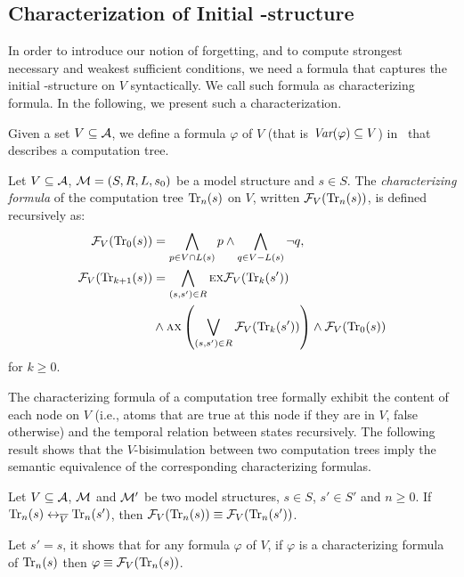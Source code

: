\documentclass[letterpaper]{article} %
\begin{document}
\subsection{Characterization of Initial \MPK-structure}

In order to introduce our notion of forgetting, and to compute strongest necessary and weakest sufficient conditions, we need a formula that captures the  initial \MPK-structure on $V$ syntactically. We call such formula as characterizing formula.
In the following, we present such a characterization.

Given a set $V\subseteq{\cal A}$, we define a formula $\varphi$ of $V$ (that is $\textit{Var}(\varphi) \subseteq V$) in \CTL\ that describes a computation tree.
\begin{definition}\label{def:V:char:formula}
Let $V\subseteq {\cal A}$, ${\cal M} =(S,R,L,s_0)$ be a model structure and $s\in S$.
The {\em characterizing formula} of the computation tree $\textrm{Tr}_n(s)$ on $V$,
written ${\cal F}_V(\textrm{Tr}_n(s))$, is defined recursively as:
\begin{align*}
   {\cal F}_V(\textrm{Tr}_0(s)) &=  \bigwedge_{p \in V\cap L(s)}p
     \wedge \bigwedge_{q\in V-L(s)} \neg q,\\
   {\cal F}_V(\textrm{Tr}_{k+1}(s))& = \bigwedge_{(s,s')\in R}
    \textsc{e} \textsc{x} {\cal F}_V(\textrm{Tr}_k(s'))\\
  &\wedge
    \textsc{a} \textsc{x} \left( \bigvee_{(s,s')\in R} {\cal F}_V(\textrm{Tr}_k(s')) \right) \wedge {\cal F}_V(\textrm{Tr}_0(s))
\end{align*}
for $k\ge 0$.
\end{definition}
The characterizing formula of a computation tree formally exhibit the content of each node on $V$ (i.e., atoms that are  true at this node if they are in $V$,  false otherwise) and the temporal relation between states recursively.  The following result shows that the $V$-bisimulation between two computation trees imply the semantic equivalence of the corresponding characterizing formulas.

\begin{lemma}\label{lem:Vb:TrFormula:Equ}
Let $V\subseteq {\cal A}$, ${\cal M}$ and ${\cal M}'$ be two model structures,
$s\in S$, $s'\in S'$ and $n\ge 0$. If $\textrm{Tr}_n(s) \leftrightarrow_{\overline V} \textrm{Tr}_n(s')$, then ${\cal F}_V(\textrm{Tr}_n(s)) \equiv {\cal F}_V(\textrm{Tr}_n(s'))$.
\end{lemma}
Let $s'=s$, it shows that for any formula $\varphi$ of $V$, if $\varphi$ is a characterizing formula of $\textrm{Tr}_n(s)$ then $\varphi \equiv {\cal F}_V(\textrm{Tr}_n(s))$.
\end{document}
